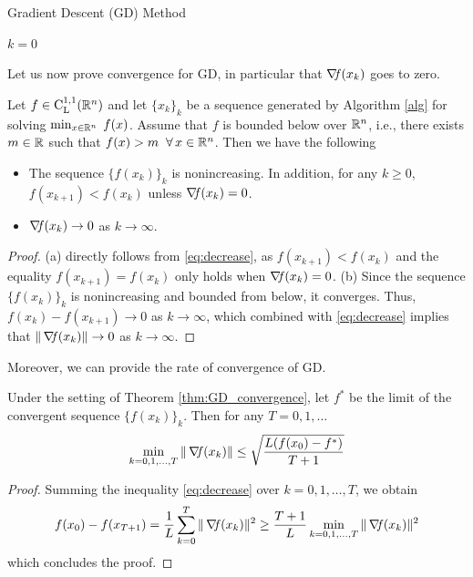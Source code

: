 \documentclass[10pt,a4paper]{article}
\begin{document}
\begin{algorithm}[H]\label{gd}
	\caption{Gradient Descent (GD) Method}
	
	
	$k = 0$
	
\end{algorithm}
\noindent Let us now prove convergence for GD, in particular that $\operatorname*{\mathit{\nabla \!f}}(x_k)$ goes to zero.
\begin{theorem}[Convergence of GD]\label{thm:GD_convergence}
	Let $f\in \mathord{\mathrm{C^{1,1}_{L}}}(\mathbb{R}^n)$ and let $\{x_k\}_k$ be a sequence generated by Algorithm \ref{alg} for solving $\min_{x\in\mathbb{R}^n}\;f(x)$. Assume that $f$ is bounded below over $\mathbb{R}^n$, i.e., there exists $m\in \mathbb{R}$ such that $f(x)>m \;\; \forall\, x\in \mathbb{R}^n$. Then we have the following
	\begin{itemize}
		\item[(a)] The sequence $\{f(x_k)\}_k$ is nonincreasing. In addition, for any $k\geq 0$, $f(x_{k+1}) < f(x_k)$ unless $\operatorname*{\mathit{\nabla \!f}}(x_k)=0$.
		\item[(b)] $\operatorname*{\mathit{\nabla \!f}}(x_k) \to 0$ as $k\to \infty$.
	\end{itemize}
\begin{proof}
	(a) directly follows from \eqref{eq:decrease}, as $f(x_{k+1}) < f(x_k)$ and the equality $f(x_{k+1}) = f(x_k)$ only holds when $\operatorname*{\mathit{\nabla \!f}}(x_k)=0$.
	(b) Since the sequence $\{f(x_k)\}_k$ is nonincreasing and bounded from below, it converges. Thus, $f(x_k) - f(x_{k+1}) \to 0$ as $k\to \infty$, which combined with \eqref{eq:decrease} implies that $\|\operatorname*{\mathit{\nabla \!f}}(x_k)\|\to 0$ as $k\to \infty$.  
\end{proof}
\end{theorem}
\noindent Moreover, we can provide the rate of convergence of GD.
\begin{theorem}
	Under the setting of Theorem \ref{thm:GD_convergence}, let $f^*$ be the limit of the convergent sequence $\{f(x_k)\}_k$. Then for any $T=0,1, \dots$
	\begin{equation*}
		\min_{k=0,1,\dots, T} \| \operatorname*{\mathit{\nabla \!f}}(x_k) \|\leq \sqrt{\frac{L (f(x_0) -f^*)}{T+1}}
	\end{equation*}
\end{theorem}
\begin{proof}
	Summing the inequality \eqref{eq:decrease} over $k=0, 1, \dots, T$, we obtain 
	\begin{equation*}
		f(x_0) - f(x_{T+1}) = \frac{1}{L}\sum_{k=0}^{T} \|\operatorname*{\mathit{\nabla \!f}}(x_k)\|^2\geq \frac{T+1}{L} \min_{k=0,1,\dots, T} \| \operatorname*{\mathit{\nabla \!f}}(x_k)\|^2
	\end{equation*}
which concludes the proof.
\end{proof}
%
%
\end{document}
